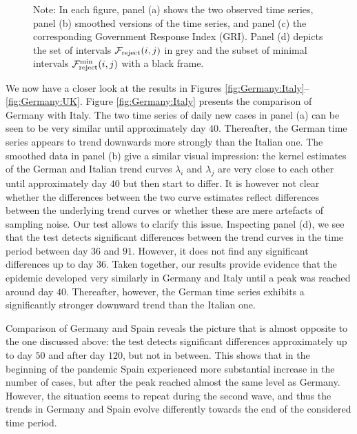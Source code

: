 \documentclass[a4paper,12pt]{article}
\numberwithin{equation}{section}
\begin{document}
\begin{figure}[p!]
\caption*{Note: In each figure, panel (a) shows the two observed time series, panel (b) smoothed versions of the time series, and panel (c) the corresponding Government Response Index (GRI). Panel (d) depicts the set of intervals $\mathcal{F}_{\text{reject}}(i,j)$ in grey and the subset of minimal intervals $\mathcal{F}_{\text{reject}}^{\text{min}}(i,j)$ with a black frame.}
\end{figure}


We now have a closer look at the results in Figures \ref{fig:Germany:Italy}--\ref{fig:Germany:UK}. Figure \ref{fig:Germany:Italy} presents the comparison of Germany with Italy. The two time series of daily new cases in panel (a) can be seen to be very similar until approximately day $40$. Thereafter, the German time series appears to trend downwards more strongly than the Italian one. The smoothed data in panel (b) give a similar visual impression: the kernel estimates of the German and Italian trend curves $\lambda_i$ and $\lambda_j$ are very close to each other until approximately day $40$ but then start to differ. It is however not clear whether the differences between the two curve estimates reflect differences between the underlying trend curves or whether these are mere artefacts of sampling noise. Our test allows to clarify this issue. Inspecting panel (d), we see that the test detects significant differences between the trend curves in the time period between day $36$ and $91$. However, it does not find any significant differences up to day $36$. 
Taken together, our results provide evidence that the epidemic developed very similarly in Germany and Italy until a peak was reached around day $40$. Thereafter, however, the German time series exhibits a significantly stronger downward trend than the Italian one. 

Comparison of Germany and Spain reveals the picture that is almost opposite to the one discussed above: the test detects significant differences approximately up to day $50$ and after day $120$, but not in between. This shows that in the beginning of the pandemic Spain experienced more substantial increase in the number of cases, but after the peak reached almost the same level as Germany. However, the situation seems to repeat during the second wave, and thus the trends in Germany and Spain evolve differently towards the end of the considered time period.
\end{document}
